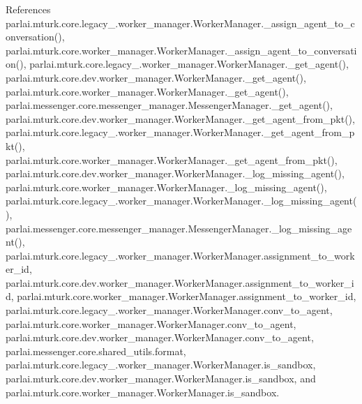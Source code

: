 References parlai.\+mturk.\+core.\+legacy\+\_.\+worker\+\_\+manager.\+Worker\+Manager.\+\_\+assign\+\_\+agent\+\_\+to\+\_\+conversation(), parlai.\+mturk.\+core.\+worker\+\_\+manager.\+Worker\+Manager.\+\_\+assign\+\_\+agent\+\_\+to\+\_\+conversation(), parlai.\+mturk.\+core.\+legacy\+\_.\+worker\+\_\+manager.\+Worker\+Manager.\+\_\+get\+\_\+agent(), parlai.\+mturk.\+core.\+dev.\+worker\+\_\+manager.\+Worker\+Manager.\+\_\+get\+\_\+agent(), parlai.\+mturk.\+core.\+worker\+\_\+manager.\+Worker\+Manager.\+\_\+get\+\_\+agent(), parlai.\+messenger.\+core.\+messenger\+\_\+manager.\+Messenger\+Manager.\+\_\+get\+\_\+agent(), parlai.\+mturk.\+core.\+dev.\+worker\+\_\+manager.\+Worker\+Manager.\+\_\+get\+\_\+agent\+\_\+from\+\_\+pkt(), parlai.\+mturk.\+core.\+legacy\+\_.\+worker\+\_\+manager.\+Worker\+Manager.\+\_\+get\+\_\+agent\+\_\+from\+\_\+pkt(), parlai.\+mturk.\+core.\+worker\+\_\+manager.\+Worker\+Manager.\+\_\+get\+\_\+agent\+\_\+from\+\_\+pkt(), parlai.\+mturk.\+core.\+dev.\+worker\+\_\+manager.\+Worker\+Manager.\+\_\+log\+\_\+missing\+\_\+agent(), parlai.\+mturk.\+core.\+worker\+\_\+manager.\+Worker\+Manager.\+\_\+log\+\_\+missing\+\_\+agent(), parlai.\+mturk.\+core.\+legacy\+\_.\+worker\+\_\+manager.\+Worker\+Manager.\+\_\+log\+\_\+missing\+\_\+agent(), parlai.\+messenger.\+core.\+messenger\+\_\+manager.\+Messenger\+Manager.\+\_\+log\+\_\+missing\+\_\+agent(), parlai.\+mturk.\+core.\+legacy\+\_.\+worker\+\_\+manager.\+Worker\+Manager.\+assignment\+\_\+to\+\_\+worker\+\_\+id, parlai.\+mturk.\+core.\+dev.\+worker\+\_\+manager.\+Worker\+Manager.\+assignment\+\_\+to\+\_\+worker\+\_\+id, parlai.\+mturk.\+core.\+worker\+\_\+manager.\+Worker\+Manager.\+assignment\+\_\+to\+\_\+worker\+\_\+id, parlai.\+mturk.\+core.\+legacy\+\_.\+worker\+\_\+manager.\+Worker\+Manager.\+conv\+\_\+to\+\_\+agent, parlai.\+mturk.\+core.\+worker\+\_\+manager.\+Worker\+Manager.\+conv\+\_\+to\+\_\+agent, parlai.\+mturk.\+core.\+dev.\+worker\+\_\+manager.\+Worker\+Manager.\+conv\+\_\+to\+\_\+agent, parlai.\+messenger.\+core.\+shared\+\_\+utils.\+format, parlai.\+mturk.\+core.\+legacy\+\_.\+worker\+\_\+manager.\+Worker\+Manager.\+is\+\_\+sandbox, parlai.\+mturk.\+core.\+dev.\+worker\+\_\+manager.\+Worker\+Manager.\+is\+\_\+sandbox, and parlai.\+mturk.\+core.\+worker\+\_\+manager.\+Worker\+Manager.\+is\+\_\+sandbox.

